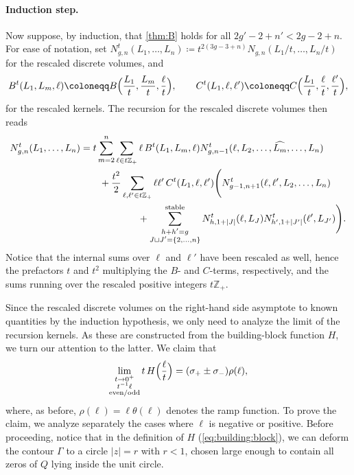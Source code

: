 \documentclass[a4paper,11pt,english]{article}
\theoremstyle{plain}
\theoremstyle{definition}
\theoremstyle{plain}
\newcommand{\Z}{\mathbb{Z}}
\begin{document}
\paragraph{Induction step.} 
Now suppose, by induction, that \cref{thm:B} holds for all $2g' - 2 + n' < 2g - 2 + n$. 
For ease of notation, set 
$N_{g,n}^{t}(L_1,\ldots,L_n) \coloneqq t^{2(3g-3+n)} N_{g,n}(L_1/t,\ldots,L_n/t)$ 
for the rescaled discrete volumes, and
\begin{equation}
    B^{t}(L_1,L_m,\ell)
    \coloneqq
    B\Bigl( \frac{L_1}{t},\frac{L_m}{t},\frac{\ell}{t} \Bigr),
    \qquad
    C^{t}(L_1,\ell,\ell')
    \coloneqq
    C\Bigl( \frac{L_1}{t},\frac{\ell}{t},\frac{\ell'}{t} \Bigr),
\end{equation}
for the rescaled kernels. The recursion for the rescaled discrete volumes then reads
\begin{equation}\label{eq:rescaled:rec}
\begin{split}
    N_{g,n}^{t}(L_1,\ldots,L_n)
    &=
    t
    \sum_{m=2}^n \sum_{\ell \in t\Z_+}
        \ell \, B^{t}(L_1,L_m,\ell)
        N_{g,n-1}^{t}(\ell,L_2,\dots, \widehat{L_m},\dots, L_n) \\
    &\qquad
    + \frac{t^2}{2} \sum_{\ell,\ell' \in t\Z_+}
        \ell \ell' \, C^{t}(L_1,\ell,\ell') \Bigg(
            N_{g-1,n+1}^{t}(\ell,\ell',L_2,\dots,L_n) \\
    &\qquad\qquad\qquad
            +
            \sum_{\substack{ h + h' = g \\ J \sqcup J' = \{2,\dots,n\} }}^{\textup{stable}}
                N_{h,1+|J|}^{t}(\ell,L_{J})
                N_{h',1+|J'|}^{t}(\ell',L_{J'})
    \Bigg).
\end{split}
\end{equation}
Notice that the internal sums over $\ell$ and $\ell'$ have been rescaled as well, hence the prefactors $t$ and $t^{2}$ multiplying the $B$- and $C$-terms, respectively, and the sums running over the rescaled positive integers $t \Z_+$.

Since the rescaled discrete volumes on the right-hand side asymptote to known quantities by the induction hypothesis, we only need to analyze the limit of the recursion kernels. 
As these are constructed from the building-block function $H$, we turn our attention to the latter. 
We claim that
\begin{equation}\label{eq:H:limit}
    \lim_{\substack{t \to 0^+ \\ t^{-1}\ell \\ \textup{even/odd}}} t \, H\Bigl( \frac{\ell}{t} \Bigr)
    =
    (\sigma_+ \pm \sigma_-) \rho(\ell),
\end{equation}
where, as before, $\rho(\ell) = \ell \theta(\ell)$ denotes the ramp function. 
To prove the claim, we analyze separately the cases where $\ell$ is negative or positive. 
Before proceeding, notice that in the definition of $H$ (\cref{eq:building:block}), we can deform the contour $\Gamma$ to a circle $|z| = r$ with $r < 1$, chosen large enough to contain all zeros of $Q$ lying inside the unit circle.
\end{document}
